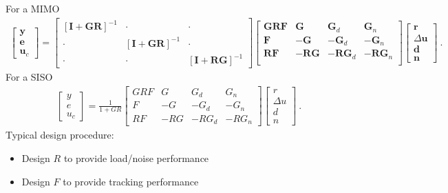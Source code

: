 \documentclass[letterpaper,10pt,english]{jupyterBook}
\begin{document}
\sphinxAtStartPar
For a MIMO
\begin{equation*}
\begin{split}
\begin{bmatrix} \mathbf{y} \\ \mathbf{e} \\ \mathbf{u}_c \end{bmatrix} =
\begin{bmatrix} \left[ \mathbf{I} + \mathbf{G} \mathbf{R} \right]^{-1} & \cdot & \cdot \\ \cdot & \left[ \mathbf{I} + \mathbf{G} \mathbf{R} \right]^{-1} & \cdot \\ \cdot & \cdot &\left[ \mathbf{I} + \mathbf{R} \mathbf{G} \right]^{-1} \end{bmatrix}
\begin{bmatrix}
  \mathbf{G} \mathbf{R} \mathbf{F} & \mathbf{G} & \mathbf{G}_d & \mathbf{G}_n \\
                        \mathbf{F} & -            \mathbf{G} & -            \mathbf{G}_d & -            \mathbf{G}_n \\
             \mathbf{R} \mathbf{F} & - \mathbf{R} \mathbf{G} & - \mathbf{R} \mathbf{G}_d & - \mathbf{R} \mathbf{G}_n \\
\end{bmatrix}
\begin{bmatrix} \mathbf{r} \\ \Delta \mathbf{u} \\ \mathbf{d} \\ \mathbf{n} \end{bmatrix} \ .
\end{split}
\end{equation*}
\sphinxAtStartPar
For a SISO
\begin{equation*}
\begin{split}
\begin{bmatrix} y \\ e \\ u_c \end{bmatrix} =
\frac{1}{1+GR} \begin{bmatrix}
 GRF & G & G_d & G_n \\
   F & -   G & -   G_d & -   G_n \\
 R F & - R G & - R G_d & - R G_n 
 \end{bmatrix}
\begin{bmatrix} r \\ \Delta u \\ d \\ n \end{bmatrix} \ .
\end{split}
\end{equation*}
\sphinxAtStartPar
{} Typical design procedure:
\begin{itemize}
\item {} 
\sphinxAtStartPar
Design \(R\) to provide load/noise performance

\item {} 
\sphinxAtStartPar
Design \(F\) to provide tracking performance

\end{itemize}
\end{document}
